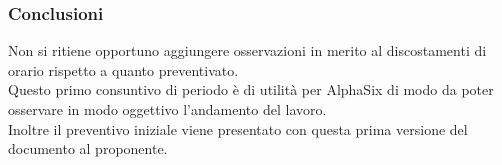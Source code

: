 	\subsubsection{Conclusioni}
	Non si ritiene opportuno aggiungere osservazioni in merito al discostamenti di orario rispetto a quanto preventivato.\\
	Questo primo consuntivo di periodo è di utilità per AlphaSix di modo da poter osservare in modo oggettivo l'andamento del lavoro.\\
	Inoltre il preventivo iniziale viene presentato con questa prima versione del documento al proponente.
	